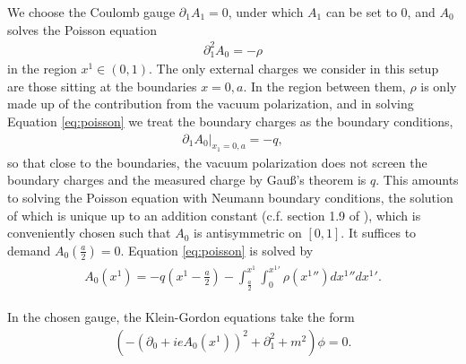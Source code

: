 We choose the Coulomb gauge $\partial_1 A_1 = 0$, under which
 $A_1$ can be set to 0, and $A_0$ solves the Poisson equation 
\begin{align}
	 \partial_1^2 A_0 = -\rho
	 \label{eq:poisson}
\end{align}
in the region $x^1 \in (0, 1)$.
The only external charges we consider in this setup are those sitting at the boundaries $x=0, a$. In the region between them, $\rho$ is only made up of the contribution from the vacuum polarization, and in solving Equation \eqref{eq:poisson} we treat the boundary charges as the boundary conditions, 
\begin{align}
 	  \left.\partial_1 A_0 \right|_{x_1=0, a}=-q,
		  \label{eq:boundary-conditions-A0}
\end{align}
so that close to the boundaries, the vacuum polarization does not screen the boundary charges and the measured charge by Gauß's theorem is $q$.
This amounts to solving the Poisson equation with Neumann boundary conditions, the solution of which is unique up to an addition constant (c.f. section 1.9 of \cite{Jackson:1998nia}), which is  conveniently chosen such that $A_0$ is antisymmetric 
on $[0, 1]$. It suffices to demand $A_0(\frac{a}{2}) = 0$. 
Equation \eqref{eq:poisson} is solved by 
\begin{align}
\begin{split}
			A_0(x^{1}) =
				   -q\left( x^{1}-\frac{a}{2} \right) - \int_{\frac{a}{2}}^{x^{1}}\int_{0}^{x^{1}'}     \rho(x^{1}'') dx^{1}'' dx^{1}' .
                   \label{eq:A0-full}
\end{split}
\end{align}

In the chosen gauge, the Klein-Gordon equations take the form
\begin{align}
    \left( -(\partial_0 +ie A_0(x^{1}))^2 + \partial_1^2 + m^2 \right) \phi = 0.
    \label{eq:TDKGE}
\end{align}

